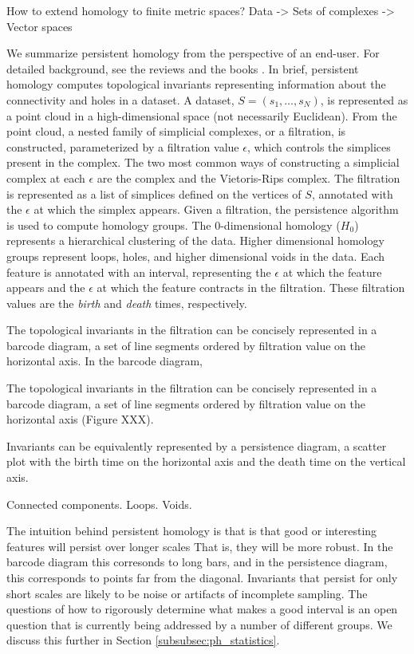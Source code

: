 How to extend homology to finite metric spaces?
Data -> Sets of complexes -> Vector spaces

We summarize persistent homology from the perspective of an end-user.
For detailed background, see the reviews \cite{Carlsson:2009a,Ghrist:2008} and the books \cite{Edelsbrunner:2010,Zomorodian:2005b}.
In brief, persistent homology computes topological invariants representing information about the connectivity and holes in a dataset.
A dataset, $S=(s_{1},\ldots,s_{N})$, is represented as a point cloud in a high-dimensional space (not necessarily Euclidean).
From the point cloud, a nested family of simplicial complexes, or a filtration, is constructed, parameterized by a filtration value $\epsilon$, which controls the simplices present in the complex.
The two most common ways of constructing a simplicial complex at each $\epsilon$ are the \Cech complex and the Vietoris-Rips complex.
The filtration is represented as a list of simplices defined on the vertices of $S$, annotated with the $\epsilon$ at which the simplex appears.
Given a filtration, the persistence algorithm is used to compute homology groups.
The $0$-dimensional homology ($H_0$) represents a hierarchical clustering of the data.
Higher dimensional homology groups represent loops, holes, and higher dimensional voids in the data.
Each feature is annotated with an interval, representing the $\epsilon$ at which the feature appears and the $\epsilon$ at which the feature contracts in the filtration.
These filtration values are the \emph{birth} and \emph{death} times, respectively.

The topological invariants in the filtration can be concisely represented in a barcode diagram, a set of line segments ordered by filtration value on the horizontal axis.
In the barcode diagram,

The topological invariants in the filtration can be concisely represented in a barcode diagram, a set of line segments ordered by filtration value on the horizontal axis (Figure XXX).

Invariants can be equivalently represented by a persistence diagram, a scatter plot with the birth time on the horizontal axis and the death time on the vertical axis.

Connected components.
Loops.
Voids.

The intuition behind persistent homology is that is that good or interesting features will persist over longer scales
That is, they will be more robust.
In the barcode diagram this corresonds to long bars, and in the persistence diagram, this corresponds to points far from the diagonal.
Invariants that persist for only short scales are likely to be noise or artifacts of incomplete sampling.
The questions of how to rigorously determine what makes a good interval is an open question that is currently being addressed by a number of different groups.
We discuss this further in Section \ref{subsubsec:ph_statistics}.

